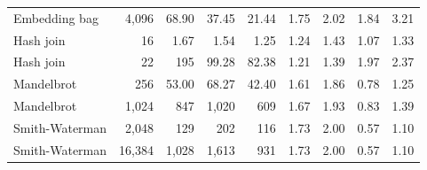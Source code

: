 \begin{table}[p]
\begin{tabular}{lrrrrrrrr}
Embedding bag & 4{,}096 & 68.90 & 37.45 & 21.44 & 1.75 & 2.02 & 1.84 & 3.21\\
Hash join & 16 & 1.67 & 1.54 & 1.25 & 1.24 & 1.43 & 1.07 & 1.33\\
Hash join & 22 & 195 & 99.28 & 82.38 & 1.21 & 1.39 & 1.97 & 2.37\\
Mandelbrot & 256 & 53.00 & 68.27 & 42.40 & 1.61 & 1.86 & 0.78 & 1.25\\
Mandelbrot & 1{,}024 & 847 & 1{,}020 & 609 & 1.67 & 1.93 & 0.83 & 1.39\\
Smith-Waterman & 2{,}048 & 129 & 202 & 116 & 1.73 & 2.00 & 0.57 & 1.10\\
Smith-Waterman & 16{,}384 & 1{,}028 & 1{,}613 & 931 & 1.73 & 2.00 & 0.57 & 1.10\\
\bottomrule
\end{tabular}

\end{table}

